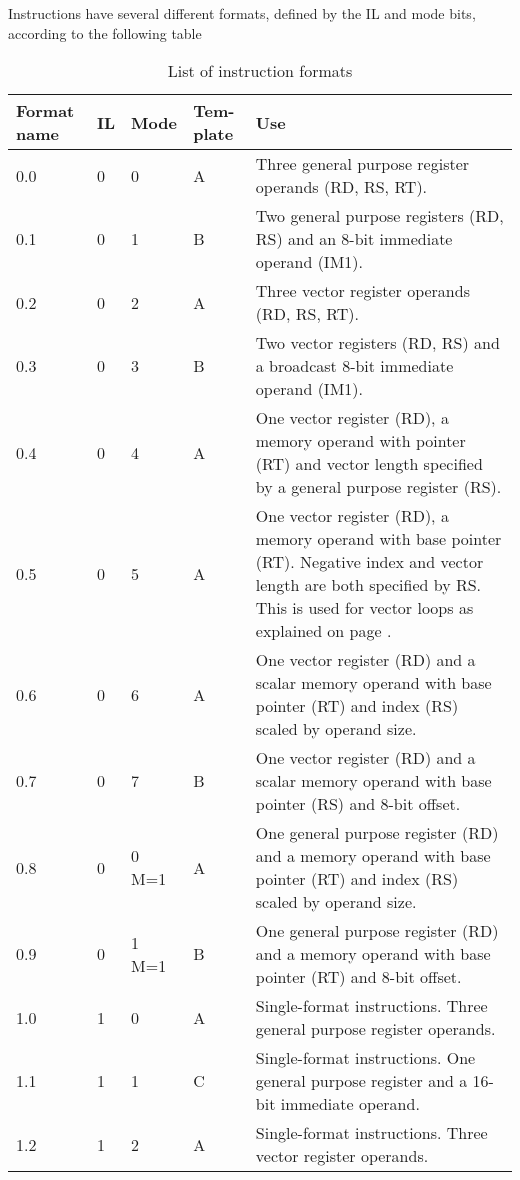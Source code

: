\documentclass[forwardcom.tex]{subfiles}
\begin{document}
Instructions have several different formats, defined by the IL and mode bits, according to the
following table

\begin{longtable} {|p{10mm}|p{7mm}|p{7mm}|p{7mm}|p{80mm}|}
\caption{List of instruction formats} \label{table:instructionFormats} \\
\endfirsthead
\endhead
\hline
Format name & IL & Mode & Tem-plate & Use  \\
\hline
0.0 & 0 & 0 & A & Three general purpose register operands (RD, RS, RT).  \\
\hline
0.1 & 0 & 1 & B & Two general purpose registers (RD, RS) and an 8-bit immediate operand (IM1). \\
\hline
0.2 & 0 & 2 & A & Three vector register operands (RD, RS, RT). \\
\hline
0.3 & 0 & 3 & B & Two vector registers (RD, RS) and a broadcast 8-bit immediate operand (IM1). \\
\hline
0.4 & 0 & 4 & A & One vector register (RD), a memory operand with pointer (RT) and vector length specified by a general purpose register (RS). \\
\hline
0.5 & 0 & 5 & A & One vector register (RD), a memory operand with base pointer (RT). Negative index and vector length are both specified by RS. This is used for vector loops as explained on page \pageref{vectorLoops}. \\
\hline
0.6 & 0 & 6 & A & One vector register (RD) and a scalar memory operand with base pointer (RT) and index (RS) scaled by operand size. \\
\hline
0.7 & 0 & 7 & B & One vector register (RD) and a scalar memory operand with base pointer (RS) and 8-bit offset. \\
\hline
0.8 & 0 & 0 M=1 & A & One general purpose register (RD) and a memory operand with base   pointer (RT) and index (RS) scaled by operand size.  \\
\hline
0.9 & 0 & 1 M=1 & B & One general purpose register (RD) and a memory operand with base pointer  (RT) and 8-bit offset. \\
\hline
1.0 & 1 & 0 & A & Single-format instructions. Three general purpose register operands. \\
\hline
1.1 & 1 & 1 & C & Single-format instructions. One general purpose register and a 16-bit immediate operand. \\
\hline
1.2 & 1 & 2 & A & Single-format instructions. Three vector register operands.  \\
\hline

\end{longtable}
\end{document}
